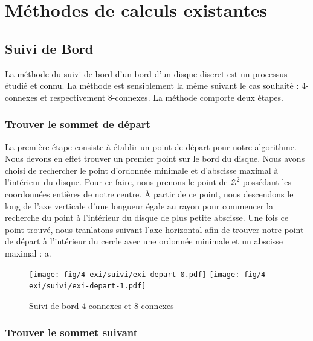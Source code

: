 \section{Méthodes de calculs existantes}

\subsection{Suivi de Bord}

La méthode du suivi de bord d'un bord d'un disque discret est un processus étudié et connu. La méthode est sensiblement la même suivant le cas souhaité : 4-connexes et respectivement 8-connexes. La méthode comporte deux étapes. 

\subsubsection{Trouver le sommet de départ}

La première étape consiste à établir un point de départ pour notre algorithme. Nous devons en effet trouver un premier point sur le bord du disque. Nous avons choisi de rechercher le point d'ordonnée minimale et d'abscisse maximal à l'intérieur du disque. Pour ce faire, nous prenons le point de $\mathcal{Z}^2$ possédant les coordonnées entières de notre centre. À partir de ce point, nous descendons le long de l'axe verticale d'une longueur égale au rayon pour commencer la recherche du point à l'intérieur du disque de plus petite abscisse. Une fois ce point trouvé, nous tranlatons suivant l'axe horizontal afin de trouver notre point de départ à l'intérieur du cercle avec une ordonnée minimale et un abscisse maximal : a. 

\begin{figure}[h!]
  \centering
  \texttt{[image: fig/4-exi/suivi/exi-depart-0.pdf]}
  \texttt{[image: fig/4-exi/suivi/exi-depart-1.pdf]}
  \caption{Suivi de bord 4-connexes et 8-connexes}
\end{figure}
  

\subsubsection{Trouver le sommet suivant}

